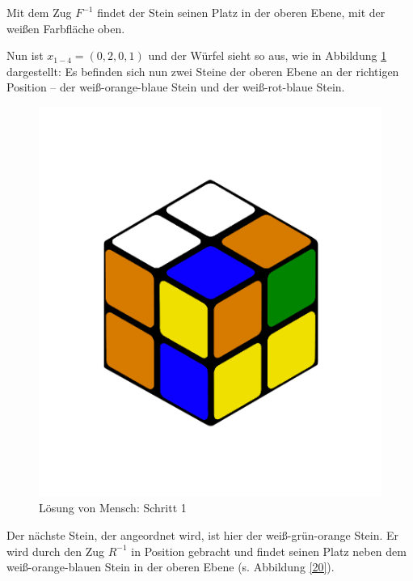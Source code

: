 \documentclass[12pt,a4paper, usenames, dvipsnames]{article}
\begin{document}
Mit dem Zug $F^{-1}$ findet der Stein seinen Platz in der oberen Ebene, mit der weißen Farbfläche oben. 

Nun ist $x_{1-4}=(0,2,0,1)$ und der Würfel sieht so aus, wie in Abbildung \ref{19} dargestellt: Es befinden sich nun zwei Steine der oberen Ebene an der richtigen Position -- der weiß-orange-blaue Stein und der weiß-rot-blaue Stein.

\begin{figure}[h]
\centering
\includegraphics[scale=0.12]{0201.png}
\caption[Lösung von Mensch: Schritt 1]{Lösung von Mensch: Schritt 1}
\label{19}
\end{figure}

Der nächste Stein, der angeordnet wird, ist hier der weiß-grün-orange Stein. Er wird durch den Zug $R^{-1}$ in Position gebracht und findet seinen Platz neben dem weiß-orange-blauen Stein in der oberen Ebene (s. Abbildung \ref{20}).
 
\end{document}
